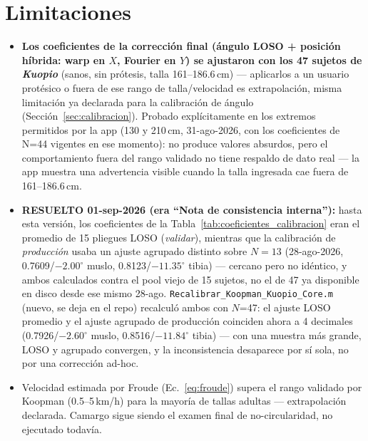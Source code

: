 \documentclass[11pt,a4paper]{scrartcl}
\begin{document}
\section{Limitaciones}
\label{sec:limitaciones}

\begin{itemize}
    \item \textbf{Los coeficientes de la corrección final (ángulo LOSO + posición híbrida: warp en $X$, Fourier en $Y$) se ajustaron con los 47 sujetos de \emph{Kuopio}} (sanos, sin prótesis, talla 161--186.6\,cm) --- aplicarlos a un usuario protésico o fuera de ese rango de talla/velocidad es extrapolación, misma limitación ya declarada para la calibración de ángulo (Sección~\ref{sec:calibracion}). Probado explícitamente en los extremos permitidos por la app (130 y 210\,cm, 31-ago-2026, con los coeficientes de N=44 vigentes en ese momento): no produce valores absurdos, pero el comportamiento fuera del rango validado no tiene respaldo de dato real --- la app muestra una advertencia visible cuando la talla ingresada cae fuera de 161--186.6\,cm.
    \item \textbf{RESUELTO 01-sep-2026 (era ``Nota de consistencia interna''):} hasta esta versión, los coeficientes de la Tabla~\ref{tab:coeficientes_calibracion} eran el promedio de 15 pliegues LOSO (\emph{validar}), mientras que la calibración de \emph{producción} usaba un ajuste agrupado distinto sobre $N=13$ (28-ago-2026, 0.7609/$-2.00^\circ$ muslo, 0.8123/$-11.35^\circ$ tibia) --- cercano pero no idéntico, y ambos calculados contra el pool viejo de 15 sujetos, no el de 47 ya disponible en disco desde ese mismo 28-ago. \texttt{Recalibrar\_Koopman\_Kuopio\_Core.m} (nuevo, se deja en el repo) recalculó ambos con $N$=47: el ajuste LOSO promedio y el ajuste agrupado de producción coinciden ahora a 4 decimales (0.7926/$-2.60^\circ$ muslo, 0.8516/$-11.84^\circ$ tibia) --- con una muestra más grande, LOSO y agrupado convergen, y la inconsistencia desaparece por sí sola, no por una corrección ad-hoc.

    \item Velocidad estimada por Froude (Ec.~\ref{eq:froude}) supera el rango validado por Koopman (0.5--5\,km/h) para la mayoría de tallas adultas --- extrapolación declarada. Camargo sigue siendo el examen final de no-circularidad, no ejecutado todavía.


\end{itemize}
\end{document}
